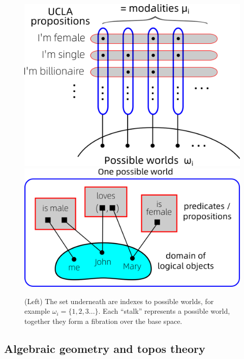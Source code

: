 \documentclass[runningheads]{llncs}
\begin{document}
\begin{figure}
	\includegraphics[scale=.4]{possible-worlds-as-sheaf.png} \qquad
	\includegraphics[scale=.35]{possible-world-single-example.png}
	\caption{(Left) The set underneath are indexes to possible worlds, for example $\omega_i = \{1,2,3...\}$. Each ``stalk'' represents a possible world, together they form a fibration over the base space.}
	\label{fig:possible-worlds-as-sheaf}
\end{figure}

\subsection{Algebraic geometry and topos theory}
\end{document}

